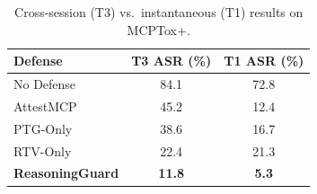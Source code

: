 \begin{table}[t]
\centering\small
\begin{tabular}{lcc}
\toprule
\textbf{Defense} & \textbf{T3 ASR (\%)} & \textbf{T1 ASR (\%)} \\
\midrule
{No Defense} & {84.1} & {72.8} \\
{AttestMCP} & {45.2} & {12.4} \\
{PTG-Only} & {38.6} & {16.7} \\
{RTV-Only} & {22.4} & {21.3} \\
\textbf{ReasoningGuard} & \textbf{11.8} & \textbf{5.3} \\
\bottomrule
\end{tabular}
\caption{Cross-session (T3) vs.\ instantaneous (T1) results on MCPTox+.}
\label{tab:t3}
\end{table}
